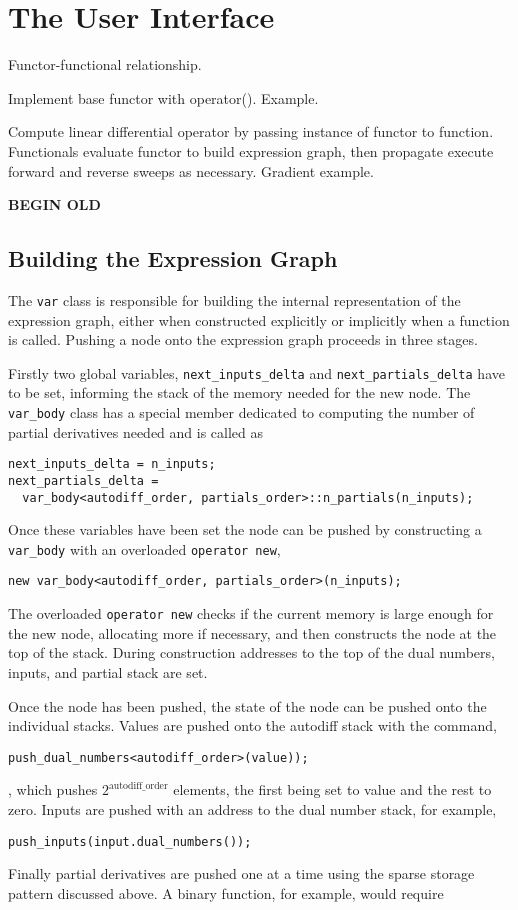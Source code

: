 \section{The \nomad User Interface}

Functor-functional relationship.

Implement base functor with operator().  Example.

Compute linear differential operator by
passing instance of functor to function.  Functionals
evaluate functor to build expression graph, then
propagate execute forward and reverse sweeps
as necessary.  Gradient example.

\textbf{BEGIN OLD}

\subsection{Building the Expression Graph}

The \verb|var| class is responsible for building the internal representation
of the expression graph, either when constructed explicitly or implicitly
when a function is called.  Pushing a node onto the expression graph 
proceeds in three stages.

Firstly two global variables, \verb|next_inputs_delta| and 
\verb|next_partials_delta| have to be set, informing the stack of the memory
needed for the new node.  The \verb|var_body| class has a special
member dedicated to computing the number of partial derivatives needed
and is called as
%
\begin{verbatim}
next_inputs_delta = n_inputs;
next_partials_delta =
  var_body<autodiff_order, partials_order>::n_partials(n_inputs);
\end{verbatim}

Once these variables have been set the node can be pushed by constructing
a \verb|var_body| with an overloaded \verb|operator new|,
%
\begin{verbatim}
new var_body<autodiff_order, partials_order>(n_inputs);
\end{verbatim}
%
The overloaded \verb|operator new| checks if the current memory is large 
enough for the new node, allocating more if necessary, and then constructs 
the node at the top of the stack.  During construction addresses to the top of 
the dual numbers, inputs, and partial stack are set.

Once the node has been pushed, the state of the node can be pushed onto
the individual stacks.  Values are pushed onto the autodiff stack with the
command,
%
\begin{verbatim}
push_dual_numbers<autodiff_order>(value));
\end{verbatim},
%
which pushes $2^{\mathrm{autodiff\_order}}$ elements, the first being set to
value and the rest to zero.  Inputs are pushed with an address to the dual
number stack, for example,
%
\begin{verbatim}
push_inputs(input.dual_numbers());
\end{verbatim}
%
Finally partial derivatives are pushed one at a time using the sparse storage
pattern discussed above.  A binary function, for example, would require

